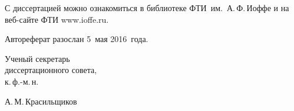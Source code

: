 \vspace{15mm}
\noindent С диссертацией можно ознакомиться в библиотеке ФТИ~им.~А.\,Ф.\,Иоффе и на веб-сайте ФТИ www.ioffe.ru.

\vspace{15mm}
\noindent Автореферат разослан 5~мая 2016~года.

\vspace{15mm}
\noindent %
\parbox[b][][b]{0.35\textwidth}{Ученый секретарь\\диссертационного совета,\\к.\,ф.-м.\,н.} 
\hfill
\parbox[b][][b]{0.6\textwidth}{{
\par}
{\hfill А.\,М.\,Красильщиков}}

\newpage